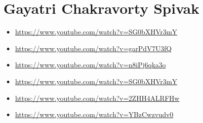 \section{Gayatri Chakravorty Spivak}
\label{sec:org8fe61bd}
\begin{itemize}
\item \url{https://www.youtube.com/watch?v=SG0bXHVr3mY}
\item \url{https://www.youtube.com/watch?v=garPdV7U3fQ}
\item \url{https://www.youtube.com/watch?v=n8iPj6qka3o}
\item \url{https://www.youtube.com/watch?v=SG0bXHVr3mY}
\item \url{https://www.youtube.com/watch?v=2ZHH4ALRFHw}
\item \url{https://www.youtube.com/watch?v=YBzCwzvudv0}
\end{itemize}

